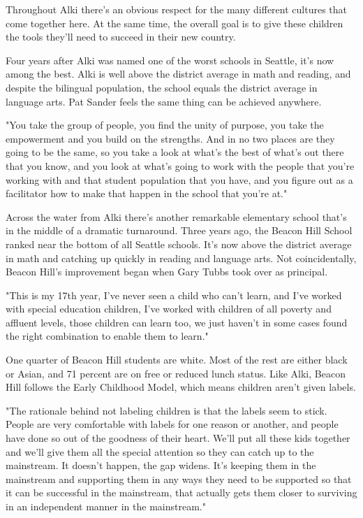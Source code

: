 Throughout Alki there's an obvious respect for the many different cultures that come together here. At the same time, the overall goal is to give these children the tools they'll need to succeed in their new country.

Four years after Alki was named one of the worst schools in Seattle, it's now among the best. Alki is well above the district average in math and reading, and despite the bilingual population, the school equals the district average in language arts. Pat Sander feels the same thing can be achieved anywhere.

"You take the group of people, you find the unity of purpose, you take the empowerment and you build on the strengths. And in no two places are they going to be the same, so you take a look at what's the best of what's out there that you know, and you look at what's going to work with the people that you're working with and that student population that you have, and you figure out as a facilitator how to make that happen in the school that you're at."

Across the water from Alki there's another remarkable elementary school that's in the middle of a dramatic turnaround. Three years ago, the Beacon Hill School ranked near the bottom of all Seattle schools. It's now above the district average in math and catching up quickly in reading and language arts. Not coincidentally, Beacon Hill's improvement began when Gary Tubbs took over as principal.

"This is my 17th year, I've never seen a child who can't learn, and I've worked with special education children, I've worked with children of all poverty and affluent levels, those children can learn too, we just haven't in some cases found the right combination to enable them to learn."

One quarter of Beacon Hill students are white. Most of the rest are either black or Asian, and 71 percent are on free or reduced lunch status. Like Alki, Beacon Hill follows the Early Childhood Model, which means children aren't given labels.

"The rationale behind not labeling children is that the labels seem to stick. People are very comfortable with labels for one reason or another, and people have done so out of the goodness of their heart. We'll put all these kids together and we'll give them all the special attention so they can catch up to the mainstream. It doesn't happen, the gap widens. It's keeping them in the mainstream and supporting them in any ways they need to be supported so that it can be successful in the mainstream, that actually gets them closer to surviving in an independent manner in the mainstream."

